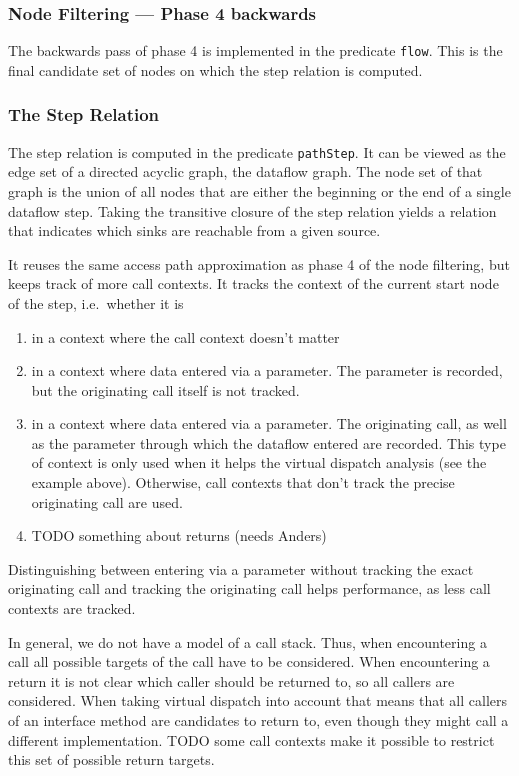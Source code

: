 \subsubsection*{Node Filtering --- Phase 4 backwards}
The backwards pass of phase 4 is implemented in the predicate \texttt{flow}.
This is the final candidate set of nodes on which the step relation is computed.

\subsubsection*{The Step Relation}
The step relation is computed in the predicate \texttt{pathStep}.
It can be viewed as the edge set of a directed acyclic graph,
the dataflow graph.
The node set of that graph is the union of all nodes that are either the beginning 
or the end of a single dataflow step.
Taking the transitive closure of the step relation yields a relation that indicates 
which sinks are reachable from a given source.

It reuses the same access path approximation as phase 4 of the node filtering,
but keeps track of more call contexts.
It tracks the context of the current start node of the step, i.e.\ whether it is
\begin{enumerate}
    \item in a context where the call context doesn't matter 
    \item in a context where data entered via a parameter. The parameter is recorded,
    but the originating call itself is not tracked.
    \item in a context where data entered via a parameter. The originating call,
    as well as the parameter through which the dataflow entered are recorded.
    This type of context is only used when it helps the virtual
    dispatch analysis (see the example above). Otherwise, call contexts that don't
    track the precise originating call are used.
    \item TODO something about returns (needs Anders)
\end{enumerate}

Distinguishing between entering via a parameter without tracking the exact originating
call and tracking the originating call helps performance, as 
less call contexts are tracked.

In general, we do not have a model of a call stack.
Thus, when encountering a call all possible targets of the call have to be considered.
When encountering a return it is not clear which caller should be returned to,
so all callers are considered.
When taking virtual dispatch into account that means that all callers of an interface 
method are candidates to return to, even though they might call a different 
implementation.
TODO some call contexts make it possible to restrict this set of possible return
targets.

